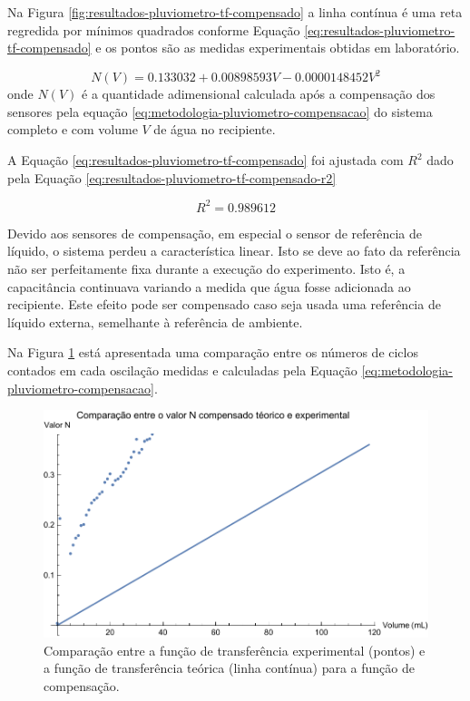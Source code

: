 \documentclass[a4paper]{instrumentacao}
\begin{document}
Na Figura \ref{fig:resultados-pluviometro-tf-compensado} a linha contínua é uma reta regredida por mínimos quadrados conforme Equação \ref{eq:resultados-pluviometro-tf-compensado} e os pontos são as medidas experimentais obtidas em laboratório.

\begin{equation}
	N(V) = 0.133032 + 0.00898593 V - 0.0000148452 V^2
	\label{eq:resultados-pluviometro-tf-compensado}
\end{equation}
\noindent onde $N(V)$ é a quantidade adimensional calculada após a compensação dos sensores pela equação \ref{eq:metodologia-pluviometro-compensacao} do sistema completo e com volume $V$ de água no recipiente.

A Equação \ref{eq:resultados-pluviometro-tf-compensado} foi ajustada com $R^2$ dado pela Equação \ref{eq:resultados-pluviometro-tf-compensado-r2} 

\begin{equation}
	R^2 = 0.989612
	\label{eq:resultados-pluviometro-tf-compensado-r2}
\end{equation}

Devido aos sensores de compensação, em especial o sensor de referência de líquido, o sistema perdeu a característica linear. Isto se deve ao fato da referência não ser perfeitamente fixa durante a execução do experimento. Isto é, a capacitância continuava variando a medida que água fosse adicionada ao recipiente. Este efeito pode ser compensado caso seja usada uma referência de líquido externa, semelhante à referência de ambiente.

Na Figura \ref{fig:resultados-pluviometro-compensacao-comparacao} está apresentada uma comparação entre os números de ciclos contados em cada oscilação medidas e calculadas pela Equação \ref{eq:metodologia-pluviometro-compensacao}.

\begin{figure}[H]
	\centering \includegraphics[width=\textwidth]{Nivel/Experimental/Compensado-Comparacao.pdf}
	\caption{Comparação entre a função de transferência experimental (pontos) e a função de transferência teórica (linha contínua) para a função de compensação.}
	\label{fig:resultados-pluviometro-compensacao-comparacao}
\end{figure}
\end{document}
